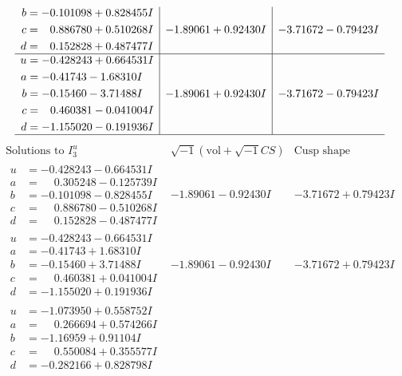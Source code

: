 \documentclass[1p]{elsarticle_modified}
\theoremstyle{definition}
\newcommand{\I}{\sqrt{-1}}
\begin{document}
$$\begin{array}{c|c|c}
\begin{aligned}
b &= -0.101098 + 0.828455 I \\
c &= \phantom{-}0.886780 + 0.510268 I \\
d &= \phantom{-}0.152828 + 0.487477 I\end{aligned}
 & -1.89061 + 0.92430 I & -3.71672 - 0.79423 I \\ \hline\begin{aligned}
u &= -0.428243 + 0.664531 I \\
a &= -0.41743 - 1.68310 I \\
b &= -0.15460 - 3.71488 I \\
c &= \phantom{-}0.460381 - 0.041004 I \\
d &= -1.155020 - 0.191936 I\end{aligned}
 & -1.89061 + 0.92430 I & -3.71672 - 0.79423 I\\
 \hline 
 \end{array}$$\newpage$$\begin{array}{c|c|c}  
\text{Solutions to }I^u_{3}& \I (\text{vol} + \sqrt{-1}CS) & \text{Cusp shape}\\
 \hline 
\begin{aligned}
u &= -0.428243 - 0.664531 I \\
a &= \phantom{-}0.305248 - 0.125739 I \\
b &= -0.101098 - 0.828455 I \\
c &= \phantom{-}0.886780 - 0.510268 I \\
d &= \phantom{-}0.152828 - 0.487477 I\end{aligned}
 & -1.89061 - 0.92430 I & -3.71672 + 0.79423 I \\ \hline\begin{aligned}
u &= -0.428243 - 0.664531 I \\
a &= -0.41743 + 1.68310 I \\
b &= -0.15460 + 3.71488 I \\
c &= \phantom{-}0.460381 + 0.041004 I \\
d &= -1.155020 + 0.191936 I\end{aligned}
 & -1.89061 - 0.92430 I & -3.71672 + 0.79423 I \\ \hline\begin{aligned}
u &= -1.073950 + 0.558752 I \\
a &= \phantom{-}0.266694 + 0.574266 I \\
b &= -1.16959 + 0.91104 I \\
c &= \phantom{-}0.550084 + 0.355577 I \\
d &= -0.282166 + 0.828798 I\end{aligned}

\end{array}$$
\end{document}
